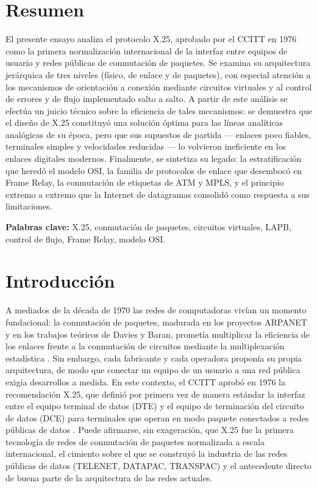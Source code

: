 \documentclass[12pt,a4paper]{article}
\begin{document}
\section{Resumen}

El presente ensayo analiza el protocolo X.25, aprobado por el CCITT en 1976 como la primera normalización internacional de la interfaz entre equipos de usuario y redes públicas de conmutación de paquetes. Se examina su arquitectura jerárquica de tres niveles (físico, de enlace y de paquetes), con especial atención a los mecanismos de orientación a conexión mediante circuitos virtuales y al control de errores y de flujo implementado salto a salto. A partir de este análisis se efectúa un juicio técnico sobre la eficiencia de tales mecanismos: se demuestra que el diseño de X.25 constituyó una solución óptima para las líneas analíticas analógicas de su época, pero que sus supuestos de partida --- enlaces poco fiables, terminales simples y velocidades reducidas --- lo volvieron ineficiente en los enlaces digitales modernos. Finalmente, se sintetiza su legado: la estratificación que heredó el modelo OSI, la familia de protocolos de enlace que desembocó en Frame Relay, la conmutación de etiquetas de ATM y MPLS, y el principio extremo a extremo que la Internet de datagramas consolidó como respuesta a sus limitaciones.

\noindent\textbf{Palabras clave:} X.25, conmutación de paquetes, circuitos virtuales, LAPB, control de flujo, Frame Relay, modelo OSI.

\section{Introducción}

A mediados de la década de 1970 las redes de computadoras vivían un momento fundacional: la conmutación de paquetes, madurada en los proyectos ARPANET y en los trabajos teóricos de Davies y Baran, prometía multiplicar la eficiencia de los enlaces frente a la conmutación de circuitos mediante la multiplexación estadística \cite{schwartz1987}. Sin embargo, cada fabricante y cada operadora proponía su propia arquitectura, de modo que conectar un equipo de un usuario a una red pública exigía desarrollos a medida. En este contexto, el CCITT aprobó en 1976 la recomendación X.25, que definió por primera vez de manera estándar la interfaz entre el equipo terminal de datos (DTE) y el equipo de terminación del circuito de datos (DCE) para terminales que operan en modo paquete conectados a redes públicas de datos \cite{itux25, rybczynski1980}. Puede afirmarse, sin exageración, que X.25 fue la primera tecnología de redes de conmutación de paquetes normalizada a escala internacional, el cimiento sobre el que se construyó la industria de las redes públicas de datos (TELENET, DATAPAC, TRANSPAC) y el antecedente directo de buena parte de la arquitectura de las redes actuales.
\end{document}
